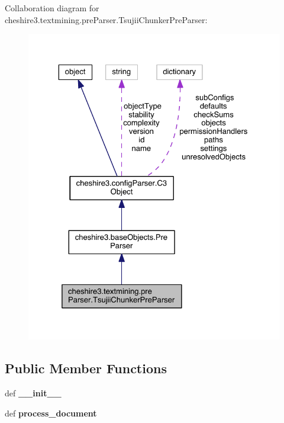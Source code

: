 Collaboration diagram for cheshire3.\-textmining.\-pre\-Parser.\-Tsujii\-Chunker\-Pre\-Parser\-:
\nopagebreak
\begin{figure}[H]
\begin{center}
\leavevmode
\includegraphics[width=325pt]{classcheshire3_1_1textmining_1_1pre_parser_1_1_tsujii_chunker_pre_parser__coll__graph}
\end{center}
\end{figure}
\subsection*{Public Member Functions}
\begin{DoxyCompactItemize}
\item 
\hypertarget{classcheshire3_1_1textmining_1_1pre_parser_1_1_tsujii_chunker_pre_parser_ae7c139b868072970c5384dbed0a4beda}{def {\bfseries \-\_\-\-\_\-init\-\_\-\-\_\-}}\label{classcheshire3_1_1textmining_1_1pre_parser_1_1_tsujii_chunker_pre_parser_ae7c139b868072970c5384dbed0a4beda}

\item 
\hypertarget{classcheshire3_1_1textmining_1_1pre_parser_1_1_tsujii_chunker_pre_parser_a27d049fc5bca30c5f99d82f70f4c14ed}{def {\bfseries process\-\_\-document}}\label{classcheshire3_1_1textmining_1_1pre_parser_1_1_tsujii_chunker_pre_parser_a27d049fc5bca30c5f99d82f70f4c14ed}

\end{DoxyCompactItemize}
